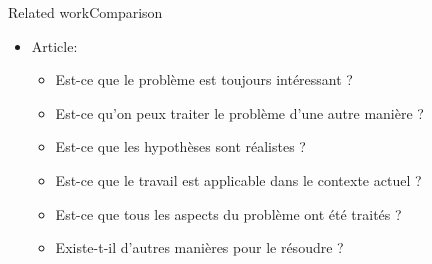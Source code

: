 \begin{frame}{Related work}{Comparison}
{\begin{itemize}
\begin{itemize}
				\item Situer le travail par rapport à l’existant sur la base de La problématique traitée
				\begin{itemize}
					\item Les critiques faites sur l’existant
					\item Les hypothèses du travail courant
					\item Les objectifs initiales du travail
					\item Les résultats théoriques et expérimentales obtenus
				\end{itemize}
			\end{itemize}
			\item Article:
			\begin{itemize}
				\item Est-ce que le problème est toujours intéressant ?
				\item Est-ce qu'on peux traiter le problème d'une autre manière ?
				\item Est-ce que les hypothèses sont réalistes ?
				\item Est-ce que le travail est applicable dans le contexte actuel ?
				\item Est-ce que tous les aspects du problème ont été traités ?
				\item Existe-t-il d’autres manières pour le résoudre ?
			\end{itemize}
		\end{itemize}
	}
\end{frame}


